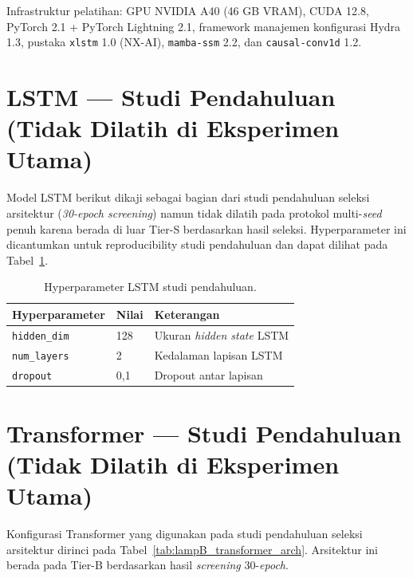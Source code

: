 Infrastruktur pelatihan: GPU NVIDIA A40 (46 GB VRAM), CUDA 12.8,
PyTorch 2.1 + PyTorch Lightning 2.1, framework manajemen konfigurasi Hydra 1.3,
pustaka \texttt{xlstm} 1.0 (NX-AI), \texttt{mamba-ssm} 2.2,
dan \texttt{causal-conv1d} 1.2.

\section{LSTM --- Studi Pendahuluan (Tidak Dilatih di Eksperimen Utama)}
\label{lamp:hparam_lstm}

Model LSTM berikut dikaji sebagai bagian dari studi pendahuluan seleksi
arsitektur (\emph{30-epoch screening}) namun tidak dilatih pada protokol
multi-\emph{seed} penuh karena berada di luar Tier-S berdasarkan hasil
seleksi. Hyperparameter ini dicantumkan untuk reproducibility studi
pendahuluan dan dapat dilihat pada Tabel~\ref{tab:lampB_lstm_arch}.

\begin{table}[ht]
  \centering
  \caption{Hyperparameter LSTM studi pendahuluan.}
  \label{tab:lampB_lstm_arch}
  \small
  \begin{tabular}{@{}lll@{}}
    \toprule
    \textbf{Hyperparameter} & \textbf{Nilai} & \textbf{Keterangan} \\
    \midrule
    \texttt{hidden\_dim} & 128 & Ukuran \emph{hidden state} LSTM \\
    \texttt{num\_layers} & 2 & Kedalaman lapisan LSTM \\
    \texttt{dropout} & 0,1 & Dropout antar lapisan \\
    \bottomrule
  \end{tabular}
\end{table}

\section{Transformer --- Studi Pendahuluan (Tidak Dilatih di Eksperimen Utama)}
\label{lamp:hparam_transformer}

Konfigurasi Transformer yang digunakan pada studi pendahuluan seleksi arsitektur
dirinci pada Tabel~\ref{tab:lampB_transformer_arch}. Arsitektur ini berada pada
Tier-B berdasarkan hasil \emph{screening} 30-\emph{epoch}.

